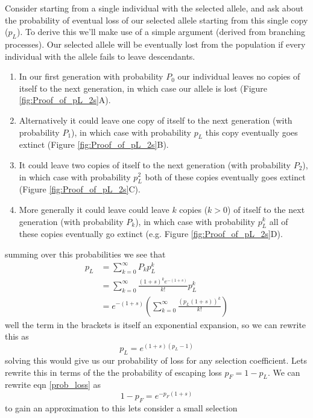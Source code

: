 Consider starting from a single individual with the selected allele, and ask
about the probability of eventual loss of our selected allele starting
from this single copy ($p_L$). To derive this we'll make use of a
simple argument (derived from branching processes). Our selected
allele will be eventually lost from the population if every individual
with the allele fails to leave descendants.
\begin{enumerate}
\item In our first generation
with probability $P_0$ our individual leaves no copies of itself to
the next generation, in which case our allele is lost (Figure \ref{fig:Proof_of_pL_2s}A).
\item Alternatively
it could leave one copy of itself to the next generation (with
probability $P_1$), in which
case with probability $p_L$ this copy eventually goes extinct (Figure \ref{fig:Proof_of_pL_2s}B).
\item It could leave two copies of itself to the next generation (with
probability $P_2$), in which
case with probability $p_L^2$ both of these copies eventually goes
extinct (Figure \ref{fig:Proof_of_pL_2s}C).
\item More generally it could leave could leave $k$ copies ($k>0$) of itself to the next generation (with
probability $P_k$), in which case with probability $p_L^k$  all of
these copies eventually go extinct (e.g. Figure \ref{fig:Proof_of_pL_2s}D).
\end{enumerate}
summing over this probabilities we see that
\begin{eqnarray}
p_L &= \sum_{k=0}^{\infty} P_k p_L^{k}  \nonumber \\
&=  \sum_{k=0}^{\infty} \frac{(1+s)^ke^{-(1+s)}}{k!} p_L^{k} \nonumber
\\
&= e^{-(1+s)} \left( \sum_{k=0}^{\infty} \frac{\left(p_L(1+s) \right)^k}{k!}  \right)
\end{eqnarray}
well the term in the brackets is itself an exponential expansion, so
we can rewrite this as
\begin{equation}
p_L = e^{(1+s)(p_L-1)} \label{prob_loss}
\end{equation}
solving this would give us our probability of loss for any selection
coefficient. Lets
rewrite this in terms of the the probability of escaping loss $p_F = 1-p_L$.  We can
rewrite eqn \eqref{prob_loss} as
\begin{equation}
1-p_F = e^{-p_F(1+s)}
\end{equation}
to gain an approximation to this lets consider a small selection

